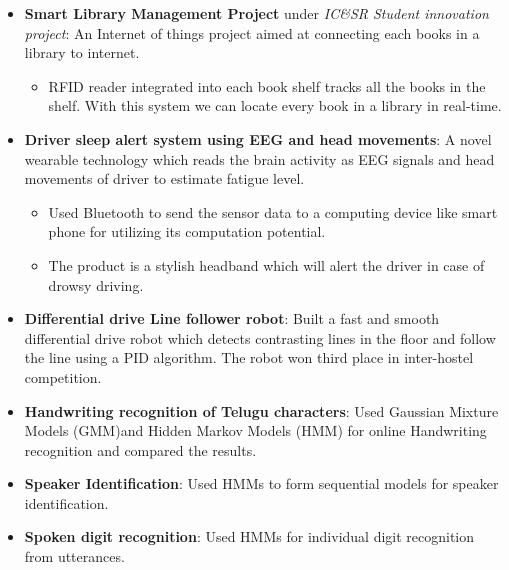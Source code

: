 \documentclass[a4paper,10pt]{article}
\begin{document}
\begin{itemize}
        \vspace{-5pt}
        \item \textbf{Smart Library Management Project} under \textit{IC\&SR Student innovation project}: An Internet of things project aimed at connecting each books in a library to internet.
        \vspace{-5pt}
        \begin{itemize}
            \setlength{\itemsep}{1pt}
            \item RFID reader integrated into each book shelf tracks all the books in the shelf. With this system we can locate every book in a library in real-time.
        \end{itemize}
        \vspace{-5pt}
        \item \textbf{Driver sleep alert system using EEG and head movements}: A novel wearable technology which reads the brain activity as EEG signals and head movements of driver to estimate fatigue level.
        \vspace{-5pt}
        \begin{itemize}
            \item Used Bluetooth to send the sensor data to a computing device like smart phone for utilizing its computation potential.
            \item The product is a stylish headband which will alert the driver in case of drowsy driving. 
        \end{itemize}                    
        \vspace{-5pt}
        \item \textbf{Differential drive Line follower robot}: Built a fast and smooth differential drive robot which detects contrasting lines in the floor and follow the line using a PID algorithm. The robot won third place in inter-hostel competition.
        \vspace{-5pt}
        \item \textbf{Handwriting recognition of Telugu characters}: Used Gaussian Mixture Models (GMM)and Hidden Markov Models (HMM) for online Handwriting recognition and compared the results.
        \vspace{-5pt}
        \item \textbf{Speaker Identification}: Used HMMs to form sequential models for speaker identification.
        \vspace{-5pt}
        \item \textbf{Spoken digit recognition}: Used HMMs for individual digit recognition from utterances. 

\end{itemize}
\end{document}
